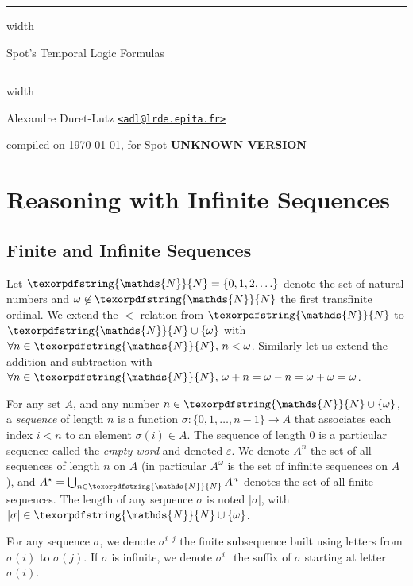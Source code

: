 \documentclass[a4paper,twoside,10pt,DIV=12]{scrreprt}
\newcommand{\N}{\texorpdfstring{\ensuremath{\mathds{N}}}{N}}
\newcommand{\0}{\texttt{0}}
\newcommand{\1}{\texttt{1}}
\def\SpotVersion{\textbf{UNKNOWN VERSION}}
\def\manualtitle{Spot's Temporal Logic Formulas}
\begin{document}
\vspace*{50pt}
\vskip4pt \hrule height 4pt width \hsize \vskip4pt
\begin{center}
  \huge \manualtitle
\end{center}
\vspace*{-1.5ex}
\vskip4pt \hrule height 4pt width \hsize \vskip4pt

\hfill Alexandre Duret-Lutz
\href{mailto:adl@lrde.epita.fr}{\nolinkurl{<adl@lrde.epita.fr>}}

\hfill compiled on \today, for Spot \SpotVersion

\vfill

\setcounter{tocdepth}{2}
\makeatletter
{}
\makeatother

\vfill

\chapter{Reasoning with Infinite Sequences}

\section{Finite and Infinite Sequences}

Let $\N=\{0,1,2,\ldots\}$ denote the set of natural numbers and
$\omega\not\in\N$ the first transfinite ordinal.  We extend the $<$
relation from $\N$ to $\N\cup\{\omega\}$ with $\forall n\in \N,\,
n<\omega$.  Similarly let us extend the addition and subtraction with
$\forall n\in\N,\,\omega+n = \omega-n = \omega+\omega = \omega$.

For any set $A$, and any number $n\in\N\cup\{\omega\}$, a
\textit{sequence} of length $n$ is a function $\sigma:
\{0,1,\ldots,n-1\}\to A$ that associates each index $i<n$ to an
element $\sigma(i)\in A$.  The sequence of length $0$ is a particular
sequence called the \textit{empty word} and denoted $\varepsilon$.  We
denote $A^n$ the set of all sequences of length $n$ on $A$ (in
particular $A^\omega$ is the set of infinite sequences on $A$), and
$A^\star=\bigcup_{n\in\N}A^n$ denotes the set of all finite sequences.
The length of any sequence $\sigma$ is noted $|\sigma|$, with
$|\sigma|\in\N\cup\{\omega\}$.

For any sequence $\sigma$, we denote $\sigma^{i..j}$ the finite
subsequence built using letters from $\sigma(i)$ to $\sigma(j)$.  If
$\sigma$ is infinite, we denote $\sigma^{i..}$ the suffix of $\sigma$
starting at letter $\sigma(i)$.
\end{document}
